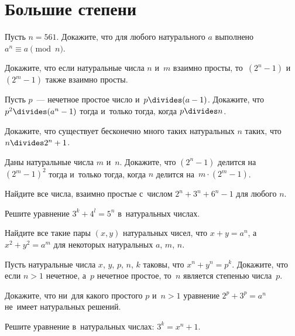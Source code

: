 

\section*{Большие степени}


\begin{problems}

\item
Пусть $n = 561$.
Докажите, что для любого натурального $a$ выполнено $a^n \equiv a \pmod{n}$.

\item
Докажите, что если натуральные числа $n$ и~$m$ взаимно просты, то~$(2^n - 1)$
и~$(2^m - 1)$ также взаимно просты.

\item
Пусть $p$~--- нечетное простое число и~$p \divides (a - 1)$.
Докажите, что $p^2 \divides (a^n - 1)$ тогда и~только тогда, когда $p \divides n$.

\item
Докажите, что существует бесконечно много таких натуральных $n$ таких, что
$n \divides 2^n + 1$.

\item
Даны натуральные числа $m$ и~$n$.
Докажите, что $(2^n - 1)$ делится на~$(2^m - 1)^2$ тогда и~только тогда, когда
$n$ делится на~$m \cdot (2^m - 1)$.

\item
Найдите все числа, взаимно простые с~числом $2^n + 3^n + 6^n - 1$ для
любого $n$.

\item
Решите уравнение $3^k + 4^l = 5^n$ в~натуральных числах.

\item
Найдите все такие пары $(x, y)$ натуральных чисел, что $x + y = a^n$,
а~$x^2 + y^2 = a^m$ для некоторых натуральных $a$, $m$, $n$.

\item
Пусть натуральные числа $x$, $y$, $p$, $n$, $k$ таковы, что $x^n + y^n = p^k$.
Докажите, что если $n > 1$ нечетное, а~$p$ нечетное простое, то~$n$ является
степенью числа~$p$.

\item
Докажите, что ни~для какого простого $p$ и~$n > 1$ уравнение $2^p + 3^p = a^n$
не~имеет натуральных решений.

\item
Решите уравнение в~натуральных числах: $3^k = x^n + 1$.

\end{problems}

